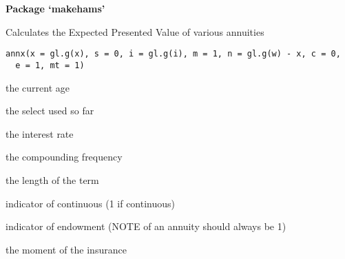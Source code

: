 \documentclass[a4paper]{book}
\begin{document}
\chapter*{}
\begin{center}
{\textbf{\huge Package `makehams'}}
\par\bigskip{\large \today}
\end{center}
\begin{description}
\raggedright{}
\item[Title]
\item[Version]
\item[Description]
\item[Depends]
\item[License]
\item[LazyData]
\end{description}
%
\begin{Description}\relax
Calculates the Expected Presented Value of various annuities
\end{Description}
%
\begin{Usage}
\begin{verbatim}
annx(x = gl.g(x), s = 0, i = gl.g(i), m = 1, n = gl.g(w) - x, c = 0,
  e = 1, mt = 1)
\end{verbatim}
\end{Usage}
%
\begin{Arguments}
\begin{ldescription}
\item[\code{x}] the current age

\item[\code{s}] the select used so far

\item[\code{i}] the interest rate

\item[\code{m}] the compounding frequency

\item[\code{n}] the length of the term

\item[\code{c}] indicator of continuous (1 if continuous)

\item[\code{e}] indicator of endowment (NOTE of an annuity should always be 1)

\item[\code{mt}] the moment of the insurance
\end{ldescription}
\end{Arguments}
\end{document}
